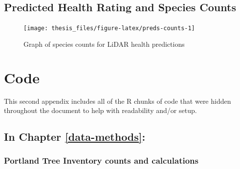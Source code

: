 \documentclass[12pt,twoside]{reedthesis}
\begin{document}
\hypertarget{predicted-health-rating-and-species-counts}{%
\section{Predicted Health Rating and Species Counts}\label{predicted-health-rating-and-species-counts}}
\begin{figure}

{\centering \texttt{[image: thesis\_files/figure-latex/preds-counts-1]} 

}

\caption{Graph of species counts for LiDAR health predictions}\label{fig:preds-counts}
\end{figure}
\hypertarget{code-chunks}{%
\chapter{Code}\label{code-chunks}}

This second appendix includes all of the R chunks of code that were
hidden throughout the document to help with readability and/or setup.

\hypertarget{in-chapter-refdata-methods}{%
\section{\texorpdfstring{\textbf{In Chapter} \ref{data-methods}\textbf{:}}{In Chapter \ref{data-methods}:}}\label{in-chapter-refdata-methods}}

\hypertarget{portland-tree-inventory-counts-and-calculations}{%
\subsection*{Portland Tree Inventory counts and calculations}\label{portland-tree-inventory-counts-and-calculations}}
\end{document}

